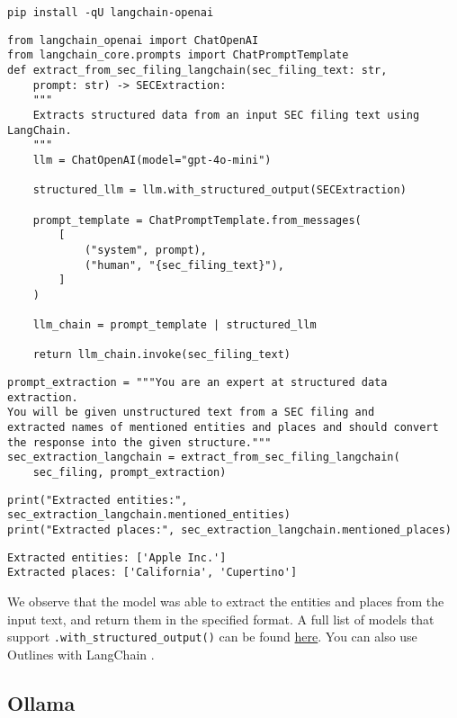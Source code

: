 \begin{verbatim}
pip install -qU langchain-openai
\end{verbatim}

\begin{verbatim}
from langchain_openai import ChatOpenAI
from langchain_core.prompts import ChatPromptTemplate
def extract_from_sec_filing_langchain(sec_filing_text: str, 
    prompt: str) -> SECExtraction:
    """
    Extracts structured data from an input SEC filing text using LangChain.
    """
    llm = ChatOpenAI(model="gpt-4o-mini")

    structured_llm = llm.with_structured_output(SECExtraction)

    prompt_template = ChatPromptTemplate.from_messages(
        [
            ("system", prompt),
            ("human", "{sec_filing_text}"),
        ]
    )

    llm_chain = prompt_template | structured_llm
    
    return llm_chain.invoke(sec_filing_text)
\end{verbatim}


\begin{verbatim}
prompt_extraction = """You are an expert at structured data extraction. 
You will be given unstructured text from a SEC filing and 
extracted names of mentioned entities and places and should convert the response into the given structure."""
sec_extraction_langchain = extract_from_sec_filing_langchain(
    sec_filing, prompt_extraction)
\end{verbatim}

\begin{verbatim}
print("Extracted entities:", sec_extraction_langchain.mentioned_entities)
print("Extracted places:", sec_extraction_langchain.mentioned_places)
\end{verbatim}

\begin{verbatim}
Extracted entities: ['Apple Inc.']
Extracted places: ['California', 'Cupertino']
\end{verbatim}

We observe that the model was able to extract the entities and places from the input text, and return them in the specified format. A full list of models that support \texttt{.with\_structured\_output()} can be found \href{https://python.langchain.com/docs/integrations/chat/#featured-providers}{here}. You can also use Outlines with LangChain .
\subsection{Ollama}

